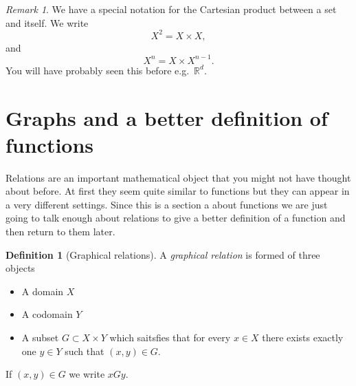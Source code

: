 \documentclass[
]{book}
\theoremstyle{definition}
\newtheorem{definition}{Definition}[chapter]
\theoremstyle{definition}
\theoremstyle{definition}
\theoremstyle{definition}
\theoremstyle{remark}
\newtheorem*{remark}{Remark}
\begin{document}
\begin{remark}
We have a special notation for the Cartesian product between a set and itself. We write
\[ X^2 = X \times X,  \] and
\[ X^n = X \times X^{n-1}.  \] You will have probably seen this before e.g.~\(\mathbb{R}^d\).
\end{remark}

\section{Graphs and a better definition of functions}\label{graphs-and-a-better-definition-of-functions}

Relations are an important mathematical object that you might not have thought about before. At first they seem quite similar to functions but they can appear in a very different settings. Since this is a section a about functions we are just going to talk enough about relations to give a better definition of a function and then return to them later.

\begin{definition}[Graphical relations]
A \emph{graphical relation} is formed of three objects

\begin{itemize}
\item
  A domain \(X\)
\item
  A codomain \(Y\)
\item
  A subset \(G \subset X \times Y\) which saitsfies that for every \(x \in X\) there exists exactly one \(y \in Y\) such that \((x,y) \in G\).
\end{itemize}

If \((x,y) \in G\) we write \(xGy\).
\end{definition}
\end{document}
